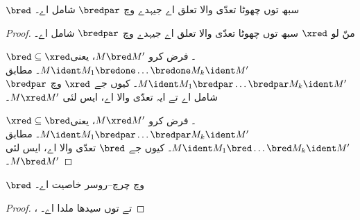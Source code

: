 \documentclass[../../../include/open-logic-section]{subfiles}
\begin{document}
\begin{lem}
  $\bred$ سبھ توں چھوٹا تعدّی والا تعلق اے جیہدے وچ $\bredpar$ شامل اے۔
\end{lem}

\begin{proof}
  منّ لو $\xred$ سبھ توں چھوٹا تعدّی والا تعلق اے جیہدے
  وچ $\bredpar$ شامل اے۔

  $\bred \subseteq \xred$۔ فرض کرو $M \bred M'$، یعنی $M \ident M_1
  \bredone \dots \bredone M_k \ident M'$۔ 
  مطابق $M
  \ident M_1 \bredpar \dots \bredpar M_k \ident M'$۔ کیوں جے $\xred$
  وچ $\bredpar$ شامل اے تے ایہ تعدّی والا اے، ایس لئی $M \xred M'$۔

  $\xred \subseteq \bred$۔ فرض کرو $M \xred M'$، یعنی $M
  \ident M_1 \bredpar \dots \bredpar M_k \ident M'$۔
   مطابق $M \ident M_1
  \bred \dots \bred M_k \ident M'$۔ کیوں جے $\bred$ تعدّی والا اے،
  ایس لئی $M
  \bred M'$۔
\end{proof}

\begin{thm}
  $\bred$ وچ چرچ–روسر خاصیت اے۔
\end{thm}

\begin{proof}
  ،  تے  توں سیدھا ملدا اے۔
\end{proof}
\end{document}
